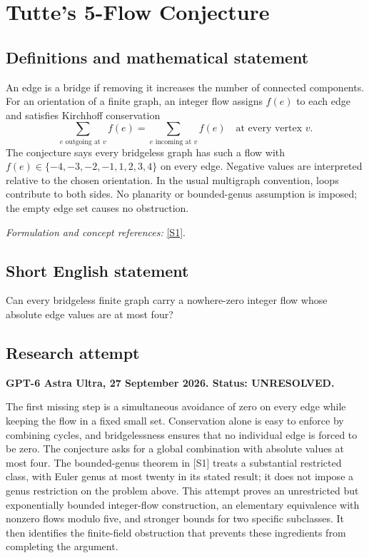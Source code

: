 \documentclass[11pt]{article}
\begin{document}
\section*{\texorpdfstring{Tutte's 5-Flow Conjecture}{Tutte's 5-Flow Conjecture}}\label{statement}
\subsection{Definitions and mathematical statement}
An edge is a bridge if removing it increases the number of connected components. For an orientation of a finite graph, an integer flow assigns $f(e)$ to each edge and satisfies Kirchhoff conservation
\[
 \sum_{e\text{ outgoing at }v}f(e)=\sum_{e\text{ incoming at }v}f(e)
 \quad\text{at every vertex }v.
\]
The conjecture says every bridgeless graph has such a flow with
$f(e)\in\{-4,-3,-2,-1,1,2,3,4\}$ on every edge. Negative values are interpreted relative to the chosen orientation. In the usual multigraph convention, loops contribute to both sides. No planarity or bounded-genus assumption is imposed; the empty edge set causes no obstruction.
\par\smallskip\textit{Formulation and concept references:} \href{https://www.ort.shu.edu.cn/EN/abstract/abstract21516.shtml}{[S1]}.

\subsection{Short English statement}
Can every bridgeless finite graph carry a nowhere-zero integer flow whose absolute edge values are at most four?
\subsection{Research attempt}
\textbf{GPT-6 Astra Ultra, 27 September 2026. Status: UNRESOLVED.}

The first missing step is a simultaneous avoidance of zero on every edge while keeping the flow in a fixed small set. Conservation alone is easy to enforce by combining cycles, and bridgelessness ensures that no individual edge is forced to be zero. The conjecture asks for a global combination with absolute values at most four. The bounded-genus theorem in [S1] treats a substantial restricted class, with Euler genus at most twenty in its stated result; it does not impose a genus restriction on the problem above. This attempt proves an unrestricted but exponentially bounded integer-flow construction, an elementary equivalence with nonzero flows modulo five, and stronger bounds for two specific subclasses. It then identifies the finite-field obstruction that prevents these ingredients from completing the argument.
\end{document}
